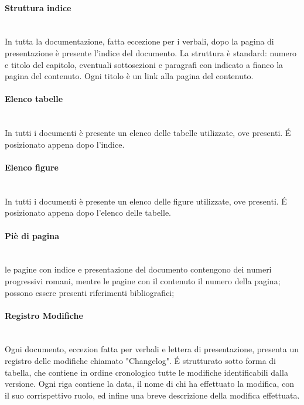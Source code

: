 \paragraph{Struttura indice} \-\\
In tutta la documentazione, fatta eccezione per i verbali, dopo la pagina di presentazione è presente l'indice del documento. La struttura è standard: numero e titolo del capitolo, eventuali sottosezioni e paragrafi con indicato a fianco la pagina del contenuto. Ogni titolo è un link alla pagina del contenuto. 

\paragraph{Elenco tabelle} \-\\
In tutti i documenti è presente un elenco delle tabelle utilizzate, ove presenti. \'E posizionato appena dopo l'indice.  

\paragraph{Elenco figure} \-\\
In tutti i documenti è presente un elenco delle figure utilizzate, ove presenti. \'E posizionato appena dopo l'elenco delle tabelle.

\paragraph{Piè di pagina} \-\\ le pagine con indice e presentazione del documento contengono dei numeri progressivi romani, mentre le pagine con il contenuto il numero della pagina; possono essere presenti riferimenti bibliografici;

\paragraph{Registro Modifiche} \-\\
Ogni documento, eccezion fatta per verbali e lettera di presentazione, presenta un registro delle modifiche chiamato "Changelog". \'E strutturato sotto forma di tabella, che contiene in ordine cronologico tutte le modifiche identificabili dalla versione.  Ogni riga contiene la data, il nome di chi ha effettuato la modifica, con il suo corrispettivo ruolo, ed infine una breve descrizione della modifica effettuata.


